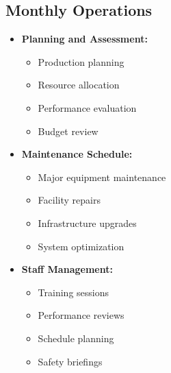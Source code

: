 \subsection{Monthly Operations}
\begin{itemize}
    \item \textbf{Planning and Assessment:}
    \begin{itemize}
        \item Production planning
        \item Resource allocation
        \item Performance evaluation
        \item Budget review
    \end{itemize}
    
    \item \textbf{Maintenance Schedule:}
    \begin{itemize}
        \item Major equipment maintenance
        \item Facility repairs
        \item Infrastructure upgrades
        \item System optimization
    \end{itemize}
    
    \item \textbf{Staff Management:}
    \begin{itemize}
        \item Training sessions
        \item Performance reviews
        \item Schedule planning
        \item Safety briefings
    \end{itemize}
\end{itemize}

